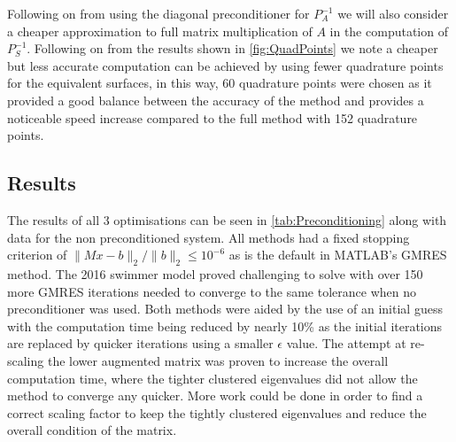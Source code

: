 Following on from using the diagonal preconditioner for $P_A^{-1}$ we will also consider a cheaper approximation to full matrix multiplication of $A$ in the computation of $P_S^{-1}$. Following on from the results shown in \cref{fig:QuadPoints} we note a  cheaper but less accurate computation can be achieved by using fewer quadrature points for the equivalent surfaces, in this way, 60 quadrature points were chosen as it provided a good balance between the accuracy of the method and provides a noticeable speed increase compared to the full method with 152 quadrature points. 

\subsection{Results}



The results of all 3 optimisations can be seen in \cref{tab:Preconditioning} along with data for the non preconditioned system. All methods had a fixed stopping criterion of $\lVert Mx-b \rVert_2/\lVert b \rVert_2 \leq 10^{-6}$ as is the default in MATLAB's GMRES method. The 2016 swimmer model proved challenging to solve with over 150 more GMRES iterations needed to converge to the same tolerance when no preconditioner was used. Both methods were aided by the use of an initial guess with the computation time being reduced by nearly 10\% as the initial iterations are replaced by quicker iterations using a smaller $\epsilon$ value. The attempt at re-scaling the lower augmented matrix was proven to increase the overall computation time, where the tighter clustered eigenvalues did not allow the method to converge any quicker. More work could be done in order to find a correct scaling factor to keep the tightly clustered eigenvalues and reduce the overall condition of the matrix. 

